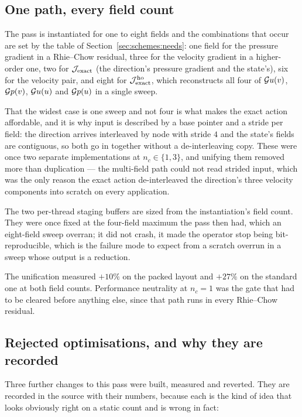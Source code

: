 \subsection{One path, every field count}

The pass is instantiated for one to eight fields and the combinations that occur are set by the
table of Section~\ref{sec:schemes:needs}: one field for the pressure gradient in a Rhie--Chow
residual, three for the velocity gradient in a higher-order one, two for $\mathcal{J}_{\mathrm{exact}}$ (the direction's
pressure gradient and the state's), six for the velocity pair, and eight for $\mathcal{J}^{\mathrm{ho}}_{\mathrm{exact}}$, which
reconstructs all four of $\mathcal{G} u(v)$, $\mathcal{G} p(v)$, $\mathcal{G} u(u)$ and $\mathcal{G} p(u)$ in a single sweep.

That the widest case is one sweep and not four is what makes the exact action affordable, and it
is why input is described by a base pointer and a stride per field: the direction arrives
interleaved by node with stride $4$ and the state's fields are contiguous, so both go in
together without a de-interleaving copy. These were once two separate implementations at
$n_c \in \{1,3\}$, and unifying them removed more than duplication --- the multi-field path could
not read strided input, which was the only reason the exact action de-interleaved the direction's
three velocity components into scratch on every application.

The two per-thread staging buffers are sized from the instantiation's field count. They were
once fixed at the four-field maximum the pass then had, which an eight-field sweep overran; it did
not crash, it made the operator stop being bit-reproducible, which is the failure mode to expect
from a scratch overrun in a sweep whose output is a reduction.

The unification measured $+10\%$ on the packed layout and $+27\%$ on the standard one at both field
counts. Performance neutrality at $n_c = 1$ was the gate that had to be cleared before anything
else, since that path runs in every Rhie--Chow residual.

\subsection{Rejected optimisations, and why they are recorded}

Three further changes to this pass were built, measured and reverted. They are recorded in the
source with their numbers, because each is the kind of idea that looks obviously right on a static
count and is wrong in fact:

